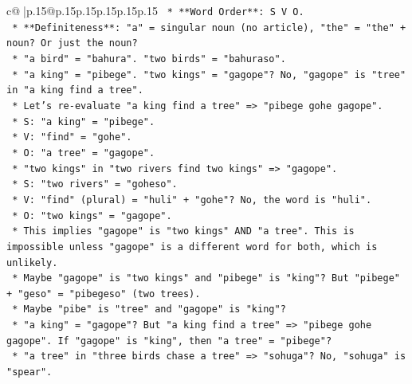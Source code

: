 \documentclass{article}
\begin{document}
{\begin{supertabular}{c@{$\;$}|p{.15\linewidth}@{}p{.15\linewidth}p{.15\linewidth}p{.15\linewidth}p{.15\linewidth}p{.15\linewidth}}
{{{\texttt{                                    *   **Word Order**: S V O.} \\
\texttt{                                    *   **Definiteness**: "a" = singular noun (no article), "the" = "the" + noun? Or just the noun?} \\
\texttt{                                        *   "a bird" = "bahura". "two birds" = "bahuraso".} \\
\texttt{                                        *   "a king" = "pibege". "two kings" = "gagope"? No, "gagope" is "tree" in "a king find a tree".} \\
\texttt{                                        *   Let's re{-}evaluate "a king find a tree" => "pibege gohe gagope".} \\
\texttt{                                            *   S: "a king" = "pibege".} \\
\texttt{                                            *   V: "find" = "gohe".} \\
\texttt{                                            *   O: "a tree" = "gagope".} \\
\texttt{                                        *   "two kings" in "two rivers find two kings" => "gagope".} \\
\texttt{                                            *   S: "two rivers" = "goheso".} \\
\texttt{                                            *   V: "find" (plural) = "huli" + "gohe"? No, the word is "huli".} \\
\texttt{                                            *   O: "two kings" = "gagope".} \\
\texttt{                                            *   This implies "gagope" is "two kings" AND "a tree". This is impossible unless "gagope" is a different word for both, which is unlikely.} \\
\texttt{                                            *   Maybe "gagope" is "two kings" and "pibege" is "king"? But "pibege" + "geso" = "pibegeso" (two trees).} \\
\texttt{                                            *   Maybe "pibe" is "tree" and "gagope" is "king"?} \\
\texttt{                                            *   "a king" = "gagope"? But "a king find a tree" => "pibege gohe gagope". If "gagope" is "king", then "a tree" = "pibege"?} \\
\texttt{                                            *   "a tree" in "three birds chase a tree" => "sohuga"? No, "sohuga" is "spear".} \\
}}}
\end{supertabular}}
\end{document}

